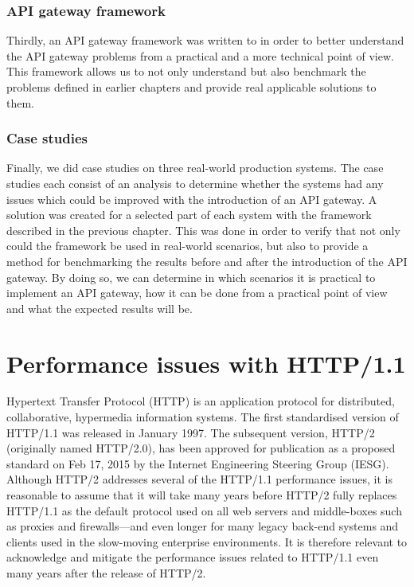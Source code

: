 \documentclass{cslthse-msc}
\begin{document}
\subsection{API gateway framework}
Thirdly, an API gateway framework was written to in order to better understand the API gateway problems from a practical and a more technical point of view. This framework allows us to not only understand but also benchmark the problems defined in earlier chapters and provide real applicable solutions to them.

\subsection{Case studies}
Finally, we did case studies on three real-world production systems. The case studies each consist of an analysis to determine whether the systems had any issues which could be improved with the introduction of an API gateway. A solution was created for a selected part of each system with the framework described in the previous chapter. This was done in order to verify that not only could the framework be used in real-world scenarios, but also to provide a method for benchmarking the results before and after the introduction of the API gateway. By doing so, we can determine in which scenarios it is practical to implement an API gateway, how it can be done from a practical point of view and what the expected results will be.

\chapter{Performance issues with HTTP/1.1}
Hypertext Transfer Protocol (HTTP) is an application protocol for distributed, collaborative, hypermedia information systems\cite{http-info}. The first standardised version of HTTP/1.1 was released in January 1997\cite{rfc2068}. The subsequent version, HTTP/2 (originally named HTTP/2.0), has been approved for publication as a proposed standard on Feb 17, 2015 by the Internet Engineering Steering Group (IESG). Although HTTP/2 addresses several of the HTTP/1.1 performance issues, it is reasonable to assume that it will take many years before HTTP/2 fully replaces HTTP/1.1 as the default protocol used on all web servers and middle-boxes such as proxies and firewalls---and even longer for many legacy back-end systems and clients used in the slow-moving enterprise environments. It is therefore relevant to acknowledge and mitigate the performance issues related to HTTP/1.1 even many years after the release of HTTP/2.
\end{document}
